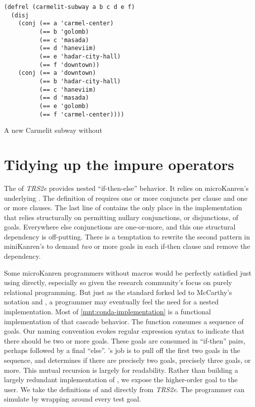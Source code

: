 \documentclass[sigplan,balance,pbalance,natbib=false]{acmart}
\begin{document}
\begin{listing}[h]
  \begin{verbatim}
(defrel (carmelit-subway a b c d e f)
  (disj
    (conj (== a 'carmel-center)
          (== b 'golomb)
          (== c 'masada)
          (== d 'haneviim)
          (== e 'hadar-city-hall)
          (== f 'downtown))
    (conj (== a 'downtown)
          (== b 'hadar-city-hall)
          (== c 'haneviim)
          (== d 'masada)
          (== e 'golomb)
          (== f 'carmel-center))))
  \end{verbatim}
  \caption{A new Carmelit subway without }\label{mnt:new-carmelit}
\end{listing}

\section{Tidying up the impure operators}\label{sec:impure}

The  of \emph{TRS2e} provides nested
\enquote{if-then-else} behavior. It relies on microKanren's
underlying . The definition of 
requires one or more conjuncts per clause and one or more clauses. The
last line of  contains the only place in the
implementation that relies structurally on permitting nullary
conjunctions, or disjunctions, of goals. Everywhere else conjunctions
are one-or-more, and this one structural dependency is off-putting.
There is a temptation to rewrite the second pattern in
miniKanren's  to demand \emph{two} or more goals in
each if-then clause and remove the dependency.

Some microKanren programmers without macros would be perfectly
satisfied just using  directly, especially so given
the research community's focus on purely relational programming. But
just as the standard forked  led to
McCarthy's  notation and , a
programmer may eventually feel the need for a nested implementation.
Most of \cref{mnt:conda-implementation} is a functional implementation
of that cascade behavior. The  function consumes a
sequence of goals. Our  naming convention evokes
regular expression syntax to indicate that there should be two or more
goals. These goals are consumed in \enquote{if-then} pairs, perhaps
followed by a final \enquote{else}. 's job is to pull
off the first two goals in the sequence, and  determines
if there are precisely two goals, precisely three goals, or more.
This mutual recursion is largely for readability. Rather than building
a largely redundant implementation of , we expose
the higher-order goal  to the user. We take the
definitions of  and  directly from
\emph{TRS2e}. The programmer can simulate  by
wrapping  around every test goal.
\end{document}
